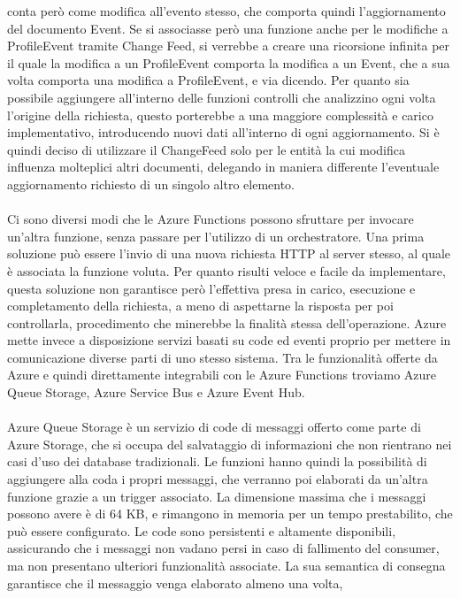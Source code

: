 conta però come modifica all'evento stesso, 
che comporta quindi l'aggiornamento del documento Event.
Se si associasse però una funzione anche per le modifiche a ProfileEvent tramite Change Feed,
si verrebbe a creare una ricorsione infinita per il quale la modifica a un ProfileEvent 
comporta la modifica a un Event, che a sua volta comporta una modifica a ProfileEvent, e via dicendo.
Per quanto sia possibile aggiungere all'interno delle funzioni controlli 
che analizzino ogni volta l'origine della richiesta,
questo porterebbe a una maggiore complessità e carico implementativo,
introducendo nuovi dati all'interno di ogni aggiornamento. 
Si è quindi deciso di utilizzare il ChangeFeed solo per le entità 
la cui modifica influenza molteplici altri documenti,
delegando in maniera differente l'eventuale aggiornamento  richiesto di un singolo altro elemento.\\
\\
Ci sono diversi modi che le Azure Functions possono sfruttare 
per invocare un'altra funzione, senza passare per l'utilizzo di un orchestratore.
Una prima soluzione può essere l'invio di una nuova richiesta HTTP al server stesso,
al quale è associata la funzione voluta.
Per quanto risulti veloce e facile da implementare,
questa soluzione non garantisce però l'effettiva presa in carico, esecuzione e completamento della richiesta,
a meno di aspettarne la risposta per poi controllarla,
procedimento che minerebbe la finalità stessa dell'operazione.
Azure mette invece a disposizione servizi basati su code ed eventi 
proprio per mettere in comunicazione diverse parti di uno stesso sistema. 
Tra le funzionalità offerte da Azure e 
quindi direttamente integrabili con le Azure Functions troviamo 
Azure Queue Storage, Azure Service Bus e Azure Event Hub.\\
\\
Azure Queue Storage è un servizio di code di messaggi
offerto come parte di Azure Storage, 
che si occupa del salvataggio di informazioni 
che non rientrano nei casi d'uso dei database tradizionali.
Le funzioni hanno quindi la possibilità di aggiungere alla coda i propri messaggi,
che verranno poi elaborati da un'altra funzione grazie a un trigger associato.
La dimensione massima che i messaggi possono avere è di 64 KB,
e rimangono in memoria per un tempo prestabilito, che può essere configurato. 
Le code sono persistenti e altamente disponibili,
assicurando che i messaggi non vadano persi in caso di fallimento del consumer,
ma non presentano ulteriori funzionalità associate. 
La sua semantica di consegna garantisce che il messaggio venga elaborato almeno una volta,
